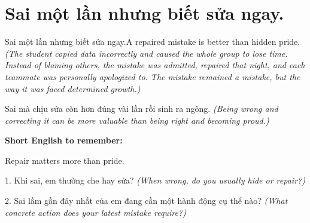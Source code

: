 \section{Sai một lần nhưng biết sửa ngay.}
\begin{truyen}{Sai một lần nhưng biết sửa ngay.}{A repaired mistake is better than hidden pride.}
\textit{(The student copied data incorrectly and caused the whole group to lose time. Instead of blaming others, the mistake was admitted, repaired that night, and each teammate was personally apologized to. The mistake remained a mistake, but the way it was faced determined growth.)}
\end{truyen}
\begin{baihoc}
Sai mà chịu sửa còn hơn đúng vài lần rồi sinh ra ngông.
\textit{(Being wrong and correcting it can be more valuable than being right and becoming proud.)}
\end{baihoc}
\begin{ghinhoanh}
\textbf{Short English to remember:}

Repair matters more than pride.
\end{ghinhoanh}
\begin{tuhocnhanh}
1. Khi sai, em thường che hay sửa? \textit{(When wrong, do you usually hide or repair?)}

2. Sai lầm gần đây nhất của em đang cần một hành động cụ thể nào? \textit{(What concrete action does your latest mistake require?)}
\end{tuhocnhanh}
\ngancach

